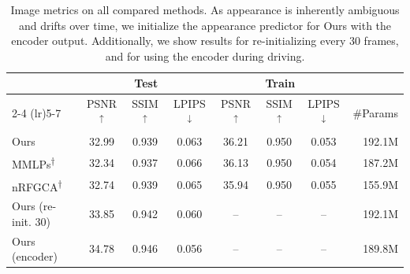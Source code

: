 \documentclass[runningheads]{llncs}
\begin{document}
\begin{table}[tb]
    \centering
    \caption{
    Image metrics on all compared methods.
    As appearance is inherently ambiguous and drifts over time, we initialize the appearance predictor for Ours with the encoder output.
    Additionally, we show results for re-initializing every 30 frames, and for using the encoder during driving.
    }
    \setlength{\tabcolsep}{3pt}
\begin{tabular}{lccccccr}
 & \multicolumn{3}{c}{Test} & \multicolumn{3}{c}{Train}\\
 \cmidrule(lr){2-4} \cmidrule(lr){5-7}
 & PSNR\textsuperscript{$\uparrow$} & SSIM\textsuperscript{$\uparrow$} & LPIPS\textsuperscript{$\downarrow$} & PSNR\textsuperscript{$\uparrow$} & SSIM\textsuperscript{$\uparrow$} & LPIPS\textsuperscript{$\downarrow$} & \#Params \\ \hline
Ours & \cellcolor{best!40}32.99 & \cellcolor{best!40}0.939 & \cellcolor{best!40}0.063 & \cellcolor{best!40}36.21 & \cellcolor{best!40}0.950 & \cellcolor{best!40}0.053 & 192.1M\\
MMLPs\textsuperscript{$\dagger$} & \cellcolor{best!00}32.34 & \cellcolor{best!00}0.937 & \cellcolor{best!00}0.066 & \cellcolor{best!15}36.13 & \cellcolor{best!40}0.950 & \cellcolor{best!15}0.054 & 187.2M\\
nRFGCA\textsuperscript{$\dagger$} & \cellcolor{best!15}32.74 & \cellcolor{best!40}0.939 & \cellcolor{best!15}0.065 & \cellcolor{best!00}35.94 & \cellcolor{best!40}0.950 & \cellcolor{best!00}0.055 & 155.9M\\
\hline
Ours (re-init. 30) & \cellcolor{best!00}33.85 & \cellcolor{best!00}0.942 & \cellcolor{best!00}0.060 & -- & -- & -- & 192.1M \\
Ours (encoder) & \cellcolor{best!00}34.78 & \cellcolor{best!00}0.946 & \cellcolor{best!00}0.056 & -- & -- & -- & 189.8M
\end{tabular}
    \label{tab:results}
\end{table}
\end{document}
